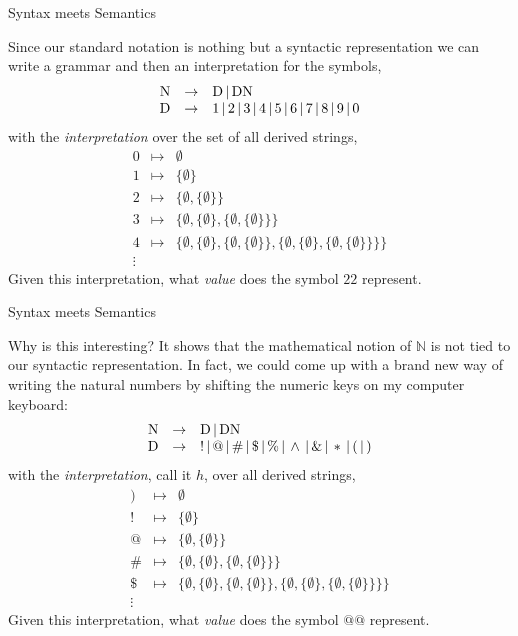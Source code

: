 \documentclass{beamer}
\begin{document}
\begin{frame}{Syntax meets Semantics}
\scriptsize

Since our standard notation is nothing but a syntactic representation we can write a grammar and then an interpretation for the symbols,
\[
\begin{array}{rcl}
\mbox{N} &\rightarrow& \mbox{D} \,|\, \mbox{D}\mbox{N}\\
\mbox{D} &\rightarrow& 1 \,|\, 2 \,|\, 3 \,|\, 4 \,|\, 5 \,|\, 6 \,|\, 7 \,|\, 8 \,|\, 9 \,|\, 0
\end{array}
\]
with the {\em interpretation} over the set of all derived strings,
\[
\begin{array}{rcl}
0 & \mapsto & \emptyset \\
1 & \mapsto & \{\emptyset \} \\
2 & \mapsto & \{ \emptyset , \{\emptyset \} \}\\
3 & \mapsto &\{ \emptyset , \{\emptyset \}, \{ \emptyset , \{\emptyset \} \} \}\\
4 & \mapsto & \{ \emptyset , \{\emptyset \}, \{ \emptyset , \{\emptyset \} \} , \{ \emptyset , \{\emptyset \}, \{ \emptyset , \{\emptyset \} \} \}\}\\
\vdots
\end{array}
\]
Given this interpretation, what {\em value} does the symbol $22$ represent.
\end{frame}

\begin{frame}{Syntax meets Semantics}
\scriptsize

Why is this interesting?  It shows that the mathematical notion of $\mathbb{N}$ is not tied to our syntactic representation.
In fact, we could come up with a brand new way of writing the natural numbers by shifting the numeric keys on my computer keyboard:
\[
\begin{array}{rcl}
\mbox{N} &\rightarrow& \mbox{D} \,|\, \mbox{D}\mbox{N}\\
\mbox{D} &\rightarrow& ! \,|\, @ \,|\, \# \,|\, \$ \,|\, \% \,|\, \wedge \,|\, \& \,|\, * \,|\, ( \,|\, )
\end{array}
\]
with the {\em interpretation}, call it $h$, over all derived strings,
\[
\begin{array}{rcl}
) & \mapsto & \emptyset \\
! & \mapsto & \{\emptyset \} \\
@ & \mapsto & \{ \emptyset , \{\emptyset \} \}\\
\# & \mapsto &\{ \emptyset , \{\emptyset \}, \{ \emptyset , \{\emptyset \} \} \}\\
\$ & \mapsto & \{ \emptyset , \{\emptyset \}, \{ \emptyset , \{\emptyset \} \} , \{ \emptyset , \{\emptyset \}, \{ \emptyset , \{\emptyset \} \} \}\}\\
\vdots
\end{array}
\]
Given this interpretation, what {\em value} does the symbol $@@$ represent.
\end{frame}
\end{document}
